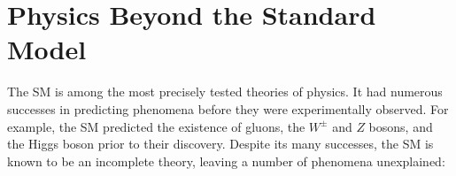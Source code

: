 \section{Physics Beyond the Standard Model}%
\label{sec:bsm}

The SM is among the most precisely tested theories of physics. It had numerous
successes in predicting phenomena before they were experimentally observed. For
example, the SM predicted the existence of gluons, the $W^\pm$ and $Z$ bosons,
and the Higgs boson prior to their discovery.
Despite its many successes, the SM is known to be an incomplete theory, leaving
a number of phenomena unexplained:
